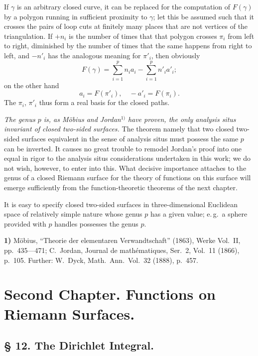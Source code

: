 \documentclass{article}
\begin{document}
If $\gamma$ is an arbitrary closed curve, it can be replaced for the computation of $F(\gamma)$ by a polygon running in sufficient proximity to $\gamma$; let this be assumed such that it crosses the pairs of loop cuts at finitely many places that are not vertices of the triangulation. If $+ n_i$ is the number of times that that polygon crosses $\pi_i$ from left to right, diminished by the number of times that the same happens from right to left, and $- n'_i$ has the analogous meaning for $\pi'_i$, then obviously
\[ F(\gamma) = \sum_{i=1}^p n_i a_i - \sum_{i=1}^p n'_i a'_i; \]
on the other hand
\[ a_i = F(\pi'_i), \quad - a'_i = F(\pi_i). \]
The $\pi_i$, $\pi'_i$ thus form a real basis for the closed paths.

\emph{The genus $p$ is, as Möbius and Jordan}${}^{1)}$ \emph{have proven, the only analysis situs invariant of closed two-sided surfaces.} The theorem namely that two closed two-sided surfaces equivalent in the sense of analysis situs must possess the same $p$ can be inverted. It causes no great trouble to remodel Jordan's proof into one equal in rigor to the analysis situs considerations undertaken in this work; we do not wish, however, to enter into this. What decisive importance attaches to the genus of a closed Riemann surface for the theory of functions on this surface will emerge sufficiently from the function-theoretic theorems of the next chapter.

It is easy to specify closed two-sided surfaces in three-dimensional Euclidean space of relatively simple nature whose genus $p$ has a given value; e.\,g.\ a sphere provided with $p$ handles possesses the genus $p$.

\textbf{1)} Möbius, ``Theorie der elementaren Verwandtschaft'' (1863), Werke Vol.~II, pp.~435---471; C.~Jordan, Journal de mathématiques, Ser.~2, Vol.~11 (1866), p.~105. Further: W.~Dyck, Math.\ Ann.\ Vol.~32 (1888), p.~457.


\section*{Second Chapter. Functions on Riemann Surfaces.}

\subsection*{§ 12. The Dirichlet Integral.}
\end{document}

